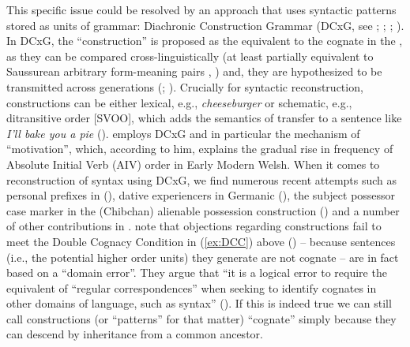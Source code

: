 \documentclass[output=paper,colorlinks,citecolor=brown]{langscibook}
\begin{document}
This specific issue could be resolved by an approach that uses syntactic patterns stored as units of grammar: Diachronic Construction Grammar (DCxG, see \citealt{mm:bardaleythorson2012};  \citealt{mm:viti_reconstructing_2015}; \citealt{mm:eythorsson_syntactic_2016}; \citealt{mm:gildea_curious_2020}). In DCxG, the “construction” is proposed as the equivalent to the cognate in the , as they can be compared cross-linguistically (at least partially equivalent to Saussurean arbitrary form-meaning pairs \citealt{mm:goldberg_constructions_1995}, \cite[18]{mm:croft_explaining_2001}) and, they are hypothesized to be transmitted across generations (\citealt{mm:traugott_constructionalization_2013}; \citealt{mm:bardhdalgildea2015diachronic}). Crucially for syntactic reconstruction, constructions can be either lexical, e.g., \textit{cheeseburger} or schematic, e.g., ditransitive order [SVOO], which adds the semantics of transfer to a sentence like \textit{I'll bake you a pie} (\citealt{mm:goldberg_constructions_1995}). \citet{mm:giacalone_ramat_gradual_2013} employs DCxG and in particular the mechanism of “motivation”, which, according to him, explains the gradual rise in frequency of Absolute Initial Verb (AIV) order in Early Modern Welsh. When it comes to reconstruction of syntax using DCxG, we find numerous recent attempts such as personal prefixes in  (\cite[322--323]{mm:gildea2002reconstructing}), dative experiencers in Germanic (\citealt{mm:bardaleythorson2012}), the subject possessor case marker in the  (Chibchan) alienable possession construction (\citealt{mm:pacchiarotti_origins_2020}) and a number of other contributions in \citet{mm:barddalgildealujan2020}. \citet{mm:gildea_curious_2020} note that objections regarding constructions fail to meet the Double Cognacy Condition in (\ref{ex:DCC}) above (\cite[50]{mm:Walkden2014}) -- because sentences (i.e., the potential higher order units) they generate are not cognate -- are in fact based on a “domain error”. They argue that ``it is a logical error to require the equivalent of ``regular correspondences'' when seeking to identify cognates in other domains of language, such as syntax'' (\cite[18]{mm:gildea_curious_2020}). If this is indeed true we can still call constructions (or “patterns” for that matter) “cognate” simply because they can descend by inheritance from a common ancestor. 
\end{document}
